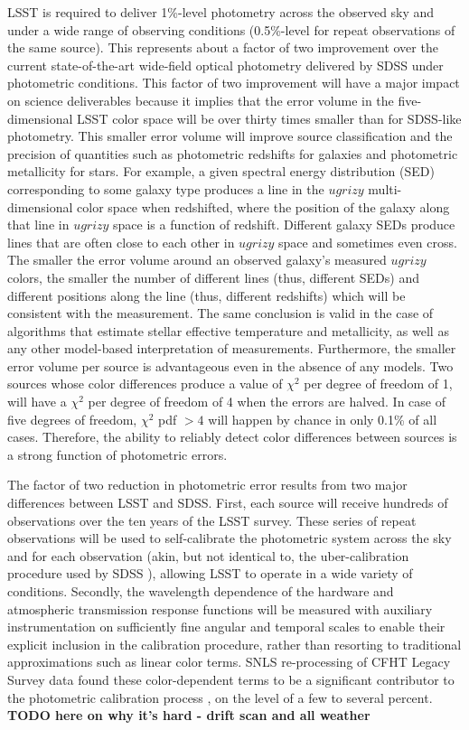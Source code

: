 \documentclass[12pt,preprint]{aastex}
\begin{document}
LSST is required to deliver 1\%-level photometry across the observed
sky and under a wide range of observing conditions (0.5\%-level for
repeat observations of the same source). This represents about a
factor of two improvement over the current state-of-the-art wide-field
optical photometry delivered by SDSS under photometric
conditions. This factor of two improvement will have a major impact on
science deliverables because it implies that the error volume in the
five-dimensional LSST color space will be over thirty times smaller
than for SDSS-like photometry. This smaller error volume will improve
source classification and the precision of quantities such as
photometric redshifts for galaxies and photometric metallicity for
stars.  For example, a given spectral energy distribution (SED)
corresponding to some galaxy type produces a line in the $ugrizy$
multi-dimensional color space when redshifted, where the position of
the galaxy along that line in $ugrizy$ space is a function of
redshift. Different galaxy SEDs produce lines that are often close to
each other in $ugrizy$ space and sometimes even cross. The smaller the
error volume around an observed galaxy's measured $ugrizy$ colors, the
smaller the number of different lines (thus, different SEDs) and
different positions along the line (thus, different redshifts) which
will be consistent with the measurement. The same conclusion is valid
in the case of algorithms that estimate stellar effective temperature
and metallicity, as well as any other model-based interpretation of
measurements. Furthermore, the smaller error volume per source is
advantageous even in the absence of any models. Two sources whose
color differences produce a value of $\chi^2$ per degree of freedom of
1, will have a $\chi^2$ per degree of freedom of 4 when the errors are
halved. In case of five degrees of freedom, $\chi^2$ pdf $>4$ will
happen by chance in only 0.1\% of all cases. Therefore, the ability to
reliably detect color differences between sources is a strong function
of photometric errors.

The factor of two reduction in photometric error results from two major differences
between LSST and SDSS. First, each source will receive hundreds of
observations over the ten years of the LSST survey. These series of
repeat observations will be used to self-calibrate the photometric
system across the sky and for each observation (akin, but not
identical to, the uber-calibration procedure used by SDSS
\citep{Padmanabhan2008}), allowing LSST to operate in a wide variety
of conditions. Secondly, the wavelength dependence of the hardware and
atmospheric transmission response functions will be measured with
auxiliary instrumentation on sufficiently fine angular and temporal
scales to enable their explicit inclusion in the calibration
procedure, rather than resorting to traditional approximations such as
linear color terms. SNLS re-processing of CFHT Legacy Survey data
found these color-dependent terms to be a significant contributor to
the photometric calibration process \citep{Regnault2009}, on
the level of a few to several percent. {\bf TODO here on why it's hard - drift scan and all weather}
\end{document}

